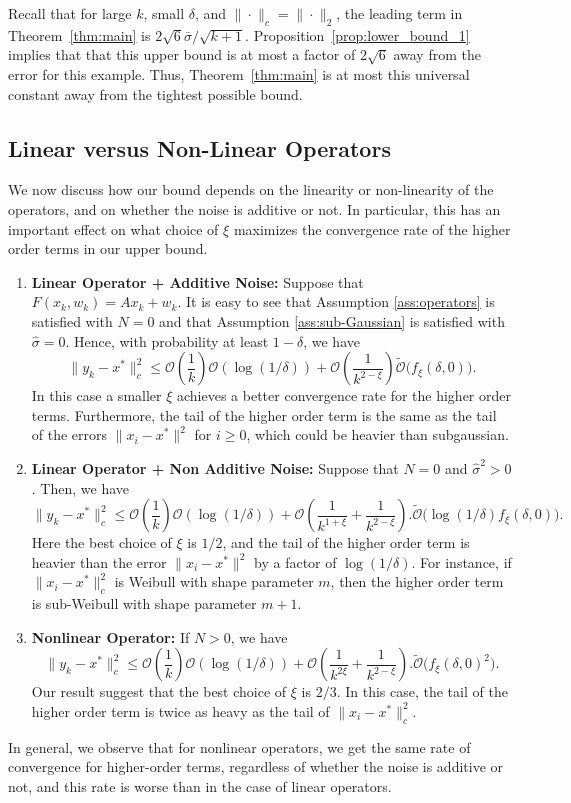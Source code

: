 \documentclass[letterpaper, 10 pt]{article}
\begin{document}
Recall that for large $k$, small $\delta$, and $\|\cdot\|_c=\|\cdot\|_2$, the leading term in Theorem~\ref{thm:main} is $2\sqrt{6} \bar{\sigma}/\sqrt{k+1}$. Proposition~\ref{prop:lower_bound_1} implies that that this upper bound is at most a factor of $2\sqrt{6}$ away from the error for this example. Thus, Theorem~\ref{thm:main} is at most this universal constant away from the tightest possible bound.

\subsection{Linear versus Non-Linear Operators}
We now discuss how our bound depends on the linearity or non-linearity of the operators, and on whether the noise is additive or not. In particular, this has an important effect on what choice of $\xi$ maximizes the convergence rate of the higher order terms in our upper bound.
\begin{enumerate}
    \item {\bf Linear Operator + Additive Noise:} Suppose that $F(x_k,w_k) = Ax_k + w_k$. It is easy to see that Assumption \ref{ass:operators} is satisfied with $N=0$ and that Assumption \ref{ass:sub-Gaussian} is satisfied with $\hat{\sigma}=0$. Hence, with probability at least $1-\delta$, we have
    \[ \|y_k-x^*\|^2_c\leq \mathcal{O}\left(\frac{1}{k}\right) \mathcal{O}(\log(1/\delta)) +\mathcal{O}\left(\frac{1}{k^{2-\xi}}\right) \tilde{\mathcal{O}}\big(f_\xi(\delta,0) \big). \]
    In this case a smaller $\xi$ achieves a better convergence rate for the higher order terms. Furthermore, the tail of the higher order term is the same as the tail of the errors $\|x_i-x^*\|^2$ for $i\geq 0$, which could be heavier than subgaussian.
    \item {\bf Linear Operator + Non Additive Noise:} Suppose that $N=0$ and $\hat{\sigma}^2>0$. Then, we have
    \[ \|y_k-x^*\|^2_c \leq \mathcal{O}\left(\frac{1}{k}\right) \mathcal{O}(\log(1/\delta))+\mathcal{O}\left(\frac{1}{k^{1+\xi}}+\frac{1}{k^{2-\xi}}\right).\tilde{\mathcal{O}}\Big(\log(1/\delta)f_\xi(\delta,0)\Big). \]
    Here the best choice of $\xi$ is $1/2$, and the tail of the higher order term is heavier than the error $\|x_i-x^*\|^2$ by a factor of $\log(1/\delta)$. For instance, if $\|x_i-x^*\|_c^2$ is Weibull with shape parameter $m$, then the higher order term is sub-Weibull with shape parameter $m+1$.
    \item {\bf Nonlinear Operator:} If $N>0$, we have
    \[ \|y_k-x^*\|^2_c \leq \mathcal{O}\left(\frac{1}{k}\right) \mathcal{O}(\log(1/\delta))+\mathcal{O}\left(\frac{1}{k^{2\xi}}+ \frac{1}{k^{2-\xi}}\right).\tilde{\mathcal{O}}\Big(f_\xi(\delta,0)^2\Big). \]
    Our result suggest that the best choice of $\xi$ is $2/3$. In this case, the tail of the higher order term is twice as heavy as the tail of $\|x_i-x^*\|_c^2$.
\end{enumerate}
In general, we observe that for nonlinear operators, we get the same rate of convergence for higher-order terms, regardless of whether the noise is additive or not, and this rate is worse than in the case of linear operators. 
\end{document}
